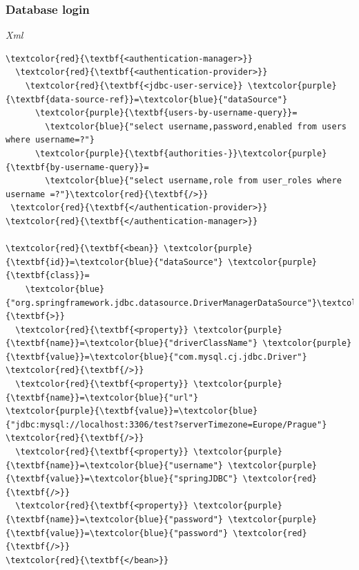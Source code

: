 \documentclass[10pt,xcolor=pdflatex, table]{beamer}
\begin{document}
\begin{frame}[fragile]\frametitle{Database login}
  \emph{Xml}
  \begin{Verbatim}[fontsize=\footnotesize, commandchars=\\\{\}]  
\textcolor{red}{\textbf{<authentication-manager>}}
  \textcolor{red}{\textbf{<authentication-provider>}}
    \textcolor{red}{\textbf{<jdbc-user-service}} \textcolor{purple}{\textbf{data-source-ref}}=\textcolor{blue}{"dataSource"} 
      \textcolor{purple}{\textbf{users-by-username-query}}=
        \textcolor{blue}{"select username,password,enabled from users where username=?"} 
      \textcolor{purple}{\textbf{authorities-}}\textcolor{purple}{\textbf{by-username-query}}=
        \textcolor{blue}{"select username,role from user_roles where username =?"}\textcolor{red}{\textbf{/>}}
 \textcolor{red}{\textbf{</authentication-provider>}}
\textcolor{red}{\textbf{</authentication-manager>}}

\textcolor{red}{\textbf{<bean}} \textcolor{purple}{\textbf{id}}=\textcolor{blue}{"dataSource"} \textcolor{purple}{\textbf{class}}=
    \textcolor{blue}{"org.springframework.jdbc.datasource.DriverManagerDataSource"}\textcolor{red}{\textbf{>}}
  \textcolor{red}{\textbf{<property}} \textcolor{purple}{\textbf{name}}=\textcolor{blue}{"driverClassName"} \textcolor{purple}{\textbf{value}}=\textcolor{blue}{"com.mysql.cj.jdbc.Driver"} \textcolor{red}{\textbf{/>}}
  \textcolor{red}{\textbf{<property}} \textcolor{purple}{\textbf{name}}=\textcolor{blue}{"url"} 
\textcolor{purple}{\textbf{value}}=\textcolor{blue}{"jdbc:mysql://localhost:3306/test?serverTimezone=Europe/Prague"} 
\textcolor{red}{\textbf{/>}}
  \textcolor{red}{\textbf{<property}} \textcolor{purple}{\textbf{name}}=\textcolor{blue}{"username"} \textcolor{purple}{\textbf{value}}=\textcolor{blue}{"springJDBC"} \textcolor{red}{\textbf{/>}}
  \textcolor{red}{\textbf{<property}} \textcolor{purple}{\textbf{name}}=\textcolor{blue}{"password"} \textcolor{purple}{\textbf{value}}=\textcolor{blue}{"password"} \textcolor{red}{\textbf{/>}}
\textcolor{red}{\textbf{</bean>}}
			\end{Verbatim}
\end{frame}
\end{document}
